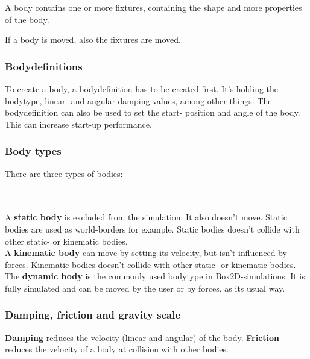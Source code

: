 \documentclass[10pt,a4paper,DIV=11]{scrreprt}
\begin{document}
A body contains one or more fixtures, containing the shape and more properties of the body.

If a body is moved, also the fixtures are moved.

\subsubsection*{Bodydefinitions}
To create a body, a bodydefinition has to be created first. It's holding the bodytype, linear- and angular damping values, among other things.
The bodydefinition can also be used to set the start- position and angle of the body. This can increase start-up performance.

\subsubsection*{Body types}
There are three types of bodies:

   \\
\\

A \textbf{static body} is excluded from the simulation. It also doesn't move. Static bodies are used as world-borders for example. Static bodies doesn't collide with other static- or kinematic bodies. \\

A \textbf{kinematic body} can move by setting its velocity, but isn't influenced by forces.
Kinematic bodies doesn't collide with other static- or kinematic bodies.\\

The \textbf{dynamic body} is the commonly used bodytype in Box2D-simulations. It is fully simulated and can be moved by the user or by forces, as its usual way.

\subsubsection*{Damping, friction and gravity scale}
\textbf{Damping} reduces the velocity (linear and angular) of the body.
\textbf{Friction} reduces the velocity of a body at collision with other bodies.
\end{document}
